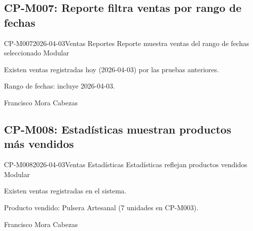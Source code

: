 \subsection{CP-M007: Reporte filtra ventas por rango de fechas}
\def\cpPasos{%
  \item Navegar a ``Reportes''.
  \item Seleccionar rango de fechas que incluya hoy.
  \item Generar reporte.}
\def\cpResultadoE{%
  \item El reporte incluye las ventas realizadas hoy durante las pruebas.}
\def\cpResultadoO{Las ventas realizadas durante las pruebas aparecieron correctamente
  en el reporte del periodo seleccionado.}
\casoprueba
  {CP-M007}{2026-04-03}{Ventas \arr{} Reportes}
  {Reporte muestra ventas del rango de fechas seleccionado}
  {Modular}{\estadoAprobado}
  {\item Existen ventas registradas hoy (2026-04-03) por las pruebas anteriores.}
  {\item Rango de fechas: incluye 2026-04-03.}
  {Francisco Mora Cabezas}

\subsection{CP-M008: Estadísticas muestran productos más vendidos}
\def\cpPasos{%
  \item Navegar a ``Estadísticas''.
  \item Verificar si aparece ``Pulsera Artesanal'' como producto vendido.}
\def\cpResultadoE{%
  \item Estadísticas reflejan la venta de Pulsera Artesanal.}
\def\cpResultadoO{``Pulsera Artesanal'' apareció en estadísticas correctamente.
  El módulo refleja las ventas realizadas.}
\casoprueba
  {CP-M008}{2026-04-03}{Ventas \arr{} Estadísticas}
  {Estadísticas reflejan productos vendidos}
  {Modular}{\estadoAprobado}
  {\item Existen ventas registradas en el sistema.}
  {\item Producto vendido: Pulsera Artesanal (7 unidades en CP-M003).}
  {Francisco Mora Cabezas}


